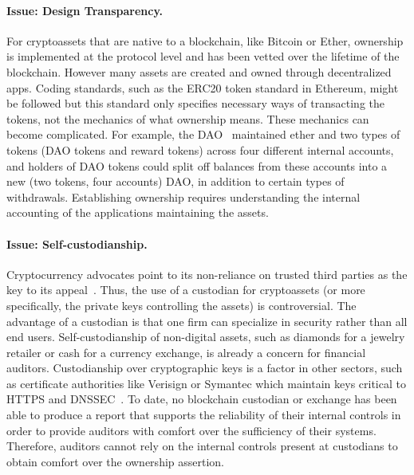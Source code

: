 \paragraph{Issue: Design Transparency.} For cryptoassets that are native to a blockchain, like Bitcoin or Ether, ownership is implemented at the protocol level and has been vetted over the lifetime of the blockchain. However many assets are created and owned through decentralized apps. Coding standards, such as the ERC20 token standard in Ethereum, might be followed but this standard only specifies necessary ways of transacting the tokens, not the mechanics of what ownership means. These mechanics can become complicated. For example, the DAO~\cite{jentzsch2016decentralized} maintained ether and two types of tokens (DAO tokens and reward tokens) across four different internal accounts, and holders of DAO tokens could split off balances from these accounts into a new (two tokens, four accounts) DAO, in addition to certain types of withdrawals. Establishing ownership requires understanding the internal accounting of the applications maintaining the assets. 

\paragraph{Issue: Self-custodianship.} Cryptocurrency advocates point to its non-reliance on trusted third parties as the key to its appeal~\cite{GCL16}. Thus, the use of a custodian for cryptoassets (or more specifically, the private keys controlling the assets) is controversial. The advantage of a custodian is that one firm can specialize in security rather than all end users. Self-custodianship of non-digital assets, such as diamonds for a jewelry retailer or cash for a currency exchange, is already a concern for financial auditors. Custodianship over cryptographic keys is a factor in other sectors, such as certificate authorities like Verisign or Symantec which maintain keys critical to HTTPS and DNSSEC~\cite{clark2013sok}. To date, no blockchain custodian or exchange has been able to produce a report that supports the reliability of their internal controls in order to provide auditors with comfort over the sufficiency of their systems. Therefore, auditors cannot rely on the internal controls present at custodians to obtain comfort over the ownership assertion. 


